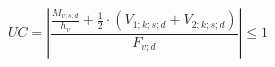 \documentclass[12pt]{article}
\begin{document}
\begin{displaymath}
UC = \left| \frac {\frac {M_{v;s;d}} {h_v} + \frac {1} {2} \cdot \left( V_{1;k;s;d} + V_{2;k;s;d} \right)} {F_{v;d}} \right| \leq 1
\end{displaymath}
\end{document}
